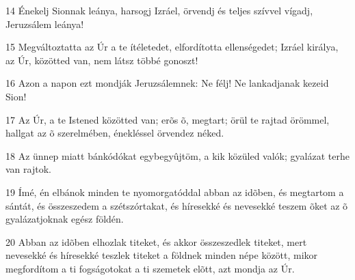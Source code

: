 \par 14 Énekelj Sionnak leánya, harsogj Izráel, örvendj és teljes szívvel vígadj, Jeruzsálem leánya!
\par 15 Megváltoztatta az Úr a te ítéletedet, elfordította ellenségedet; Izráel királya, az Úr, közötted van, nem látsz többé gonoszt!
\par 16 Azon a napon ezt mondják Jeruzsálemnek: Ne félj! Ne lankadjanak kezeid Sion!
\par 17 Az Úr, a te Istened közötted van; erõs õ, megtart; örül te rajtad örömmel, hallgat az õ szerelmében, énekléssel örvendez néked.
\par 18 Az ünnep miatt bánkódókat egybegyûjtöm, a kik közüled valók; gyalázat terhe van rajtok.
\par 19 Ímé, én elbánok minden te nyomorgatóddal abban az idõben, és megtartom a sántát, és összeszedem a szétszórtakat, és híresekké és nevesekké teszem õket az õ gyalázatjoknak egész földén.
\par 20 Abban az idõben elhozlak titeket, és akkor összeszedlek titeket, mert nevesekké és híresekké teszlek titeket a földnek minden népe között, mikor megfordítom a ti fogságotokat a ti szemetek elõtt, azt mondja az Úr.


